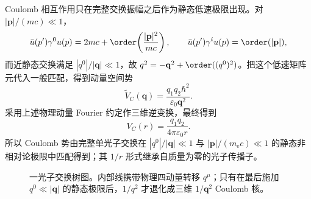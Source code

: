 Coulomb 相互作用只在完整交换振幅之后作为静态低速极限出现。对 $|\mathbf p|/(mc)\ll1$，
\begin{equation}
 \bar u(p')\gamma^0u(p)=2mc+\order\!\left(\frac{|\mathbf p|^2}{mc}\right),
 \qquad
 \bar u(p')\gamma^iu(p)=\order(|\mathbf p|),
 \label{eq:qed-current-nr-r13}
\end{equation}
而近静态交换满足 $|q^0|/|\mathbf q|\ll1$，故 $q^2=-\mathbf q^2+\order((q^0)^2)$。把这个低速矩阵元代入一般匹配，得到动量空间势
\begin{equation}
 \boxed{
 \widetilde V_C(\mathbf q)
 =\frac{q_1q_2\hbar^2}{\varepsilon_0\mathbf q^2}.}
 \label{eq:coulomb-Vq-r13}
\end{equation}
采用上述物理动量 Fourier 约定作三维逆变换，最终得到
\begin{equation}
 \boxed{V_C(r)=\frac{q_1q_2}{4\pi\varepsilon_0r}.}
 \label{eq:coulomb-from-qed-r13}
\end{equation}
所以 Coulomb 势由完整单光子交换在 $|q^0|/|\mathbf q|\ll1$ 与 $|\mathbf p|/(m_{\mathrm e} c)\ll1$ 的静态非相对论极限中匹配得到；其 $1/r$ 形式继承自质量为零的光子传播子。

\begin{figure}[htbp]
 \centering
 
 \caption{一光子交换树图。内部线携带物理四动量转移 $q^\mu$；只有在最后施加 $q^0\ll|\mathbf q|$ 的静态极限后，$1/q^2$ 才退化成三维 $1/\mathbf q^2$ Coulomb 核。}
 \label{fig:qed-exchange-r13}
\end{figure}

